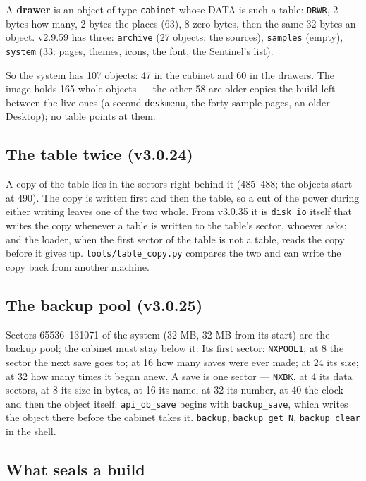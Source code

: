 \documentclass[11pt,a4paper]{article}
\newcommand{\file}[1]{\texttt{#1}}
\newcommand{\cmd}[1]{\texttt{#1}}
\begin{document}
A \textbf{drawer} is an object of type \texttt{cabinet} whose DATA is such a table: \texttt{DRWR},
2 bytes how many, 2 bytes the places (63), 8 zero bytes, then the same 32 bytes an object.
v2.9.59 has three: \texttt{archive} (27 objects: the sources), \texttt{samples} (empty),
\texttt{system} (33: pages, themes, icons, the font, the Sentinel's list).

So the system has 107 objects: 47 in the cabinet and 60 in the drawers. The image holds 165
whole objects --- the other 58 are older copies the build left between the live ones (a second
\texttt{deskmenu}, the forty sample pages, an older Desktop); no table points at them.

\subsection{The table twice (v3.0.24)}

A copy of the table lies in the sectors right behind it (485--488; the objects start at 490).
The copy is written first and then the table, so a cut of the power during either writing
leaves one of the two whole. From v3.0.35 it is \texttt{disk\_io} itself that writes the copy
whenever a table is written to the table's sector, whoever asks; and the loader, when the first
sector of the table is not a table, reads the copy before it gives up.
\file{tools/table\_copy.py} compares the two and can write the copy back from another machine.

\subsection{The backup pool (v3.0.25)}

Sectors 65536--131071 of the system (32 MB, 32 MB from its start) are the backup pool; the
cabinet must stay below it. Its first sector: \texttt{NXPOOL1}; at 8 the sector the next save
goes to; at 16 how many saves were ever made; at 24 its size; at 32 how many times it began
anew. A save is one sector --- \texttt{NXBK}, at 4 its data sectors, at 8 its size in bytes,
at 16 its name, at 32 its number, at 40 the clock --- and then the object itself.
\texttt{api\_ob\_save} begins with \texttt{backup\_save}, which writes the object there before
the cabinet takes it. \cmd{backup}, \cmd{backup get N}, \cmd{backup clear} in the shell.

\subsection{What seals a build}
\end{document}
